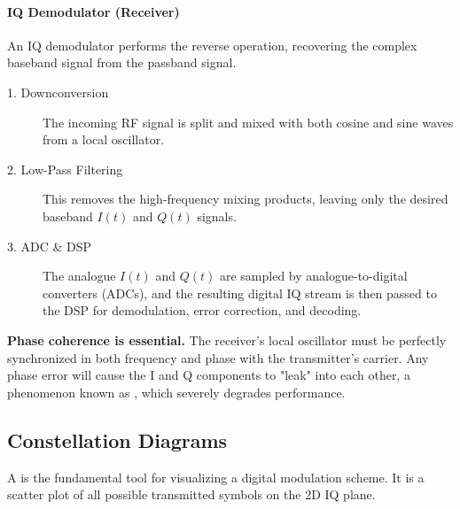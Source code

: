 \paragraph{IQ Demodulator (Receiver)}
An IQ demodulator performs the reverse operation, recovering the complex baseband signal from the passband signal.
\begin{description}
    \item[1. Downconversion] The incoming RF signal is split and mixed with both cosine and sine waves from a local oscillator.
    \item[2. Low-Pass Filtering] This removes the high-frequency mixing products, leaving only the desired baseband $I(t)$ and $Q(t)$ signals.
    \item[3. ADC & DSP] The analogue $I(t)$ and $Q(t)$ are sampled by analogue-to-digital converters (ADCs), and the resulting digital IQ stream is then passed to the DSP for demodulation, error correction, and decoding.
\end{description}

\begin{warningbox}
    \textbf{Phase coherence is essential.} The receiver's local oscillator must be perfectly synchronized in both frequency and phase with the transmitter's carrier. Any phase error will cause the I and Q components to "leak" into each other, a phenomenon known as , which severely degrades performance.
\end{warningbox}

\subsection{Constellation Diagrams}

A  is the fundamental tool for visualizing a digital modulation scheme. It is a scatter plot of all possible transmitted symbols on the 2D IQ plane.

\begin{center}
\end{center}

